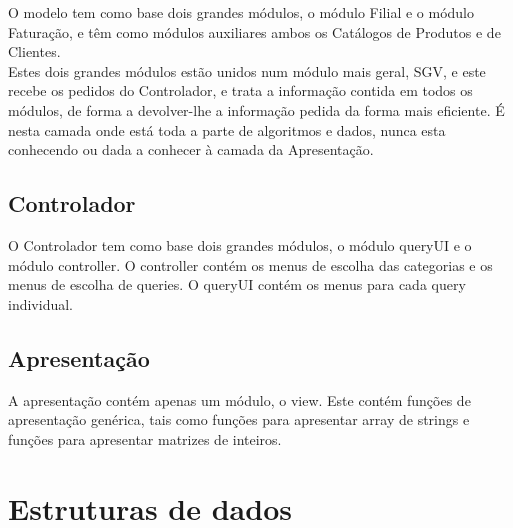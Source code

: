\documentclass[a4paper]{report}
\begin{document}
O modelo tem como base dois grandes módulos, o módulo Filial e o módulo Faturação,
e têm como módulos auxiliares ambos os Catálogos de Produtos e de Clientes.\\
Estes dois grandes módulos estão unidos num módulo mais geral, SGV, e este recebe
os pedidos do Controlador, e trata a informação contida em todos os módulos, de 
forma a devolver-lhe a informação pedida da forma mais eficiente. É nesta camada
onde está toda a parte de algoritmos e dados, nunca esta conhecendo ou dada a
conhecer à camada da Apresentação.

\section{Controlador}

O Controlador tem como base dois grandes módulos, o módulo queryUI e o módulo controller.
O controller contém os menus de escolha das categorias e os menus de escolha de queries.
O queryUI contém os menus para cada query individual.

\section{Apresentação}

A apresentação contém apenas um módulo, o view. Este contém funções de apresentação genérica,
tais como funções para apresentar array de strings e funções para apresentar matrizes de inteiros.

\chapter{Estruturas de dados}
\end{document}
